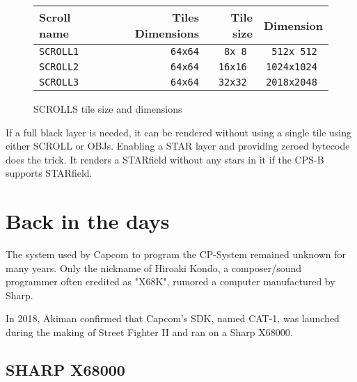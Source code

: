 \begin{figure}[H]
\begin{tabularx}{\textwidth}{Xrrr}
  \toprule    
  \textbf{Scroll name } & \textbf{ Tiles Dimensions } & \textbf{ Tile size }  & \textbf{Dimension }\\  
  \toprule   
    
\texttt{SCROLL1} & \texttt{64x64} & \texttt{8x 8 } &  \texttt{512x 512 }  \\  
\texttt{SCROLL2} & \texttt{64x64} & \texttt{16x16 } &  \texttt{1024x1024 }   \\  
\texttt{SCROLL3} & \texttt{64x64} & \texttt{32x32 } &  \texttt{2018x2048 }   \\  
  \toprule   
\end{tabularx}
\vspace*{-1mm} %
\caption*{SCROLLS tile size and dimensions}
\end{figure}

If a full black layer is needed, it can be rendered without using a single tile using either SCROLL or OBJs. Enabling a STAR  layer and providing zeroed bytecode does the trick. It renders a STARfield without any stars in it if the CPS-B supports STARfield.
























\pagebreak

\section{Back in the days}
The system used by Capcom to program the CP-System remained unknown for many years. Only the nickname of Hiroaki Kondo, a composer/sound programmer often credited as "X68K", rumored a computer manufactured by Sharp. 

In 2018,  Akiman confirmed\cite{x68000usage1}\cite{x68000usage2} that Capcom's SDK, named CAT-1, was launched during the making of Street Fighter II and ran on a Sharp X68000.

\subsection{SHARP X68000}

